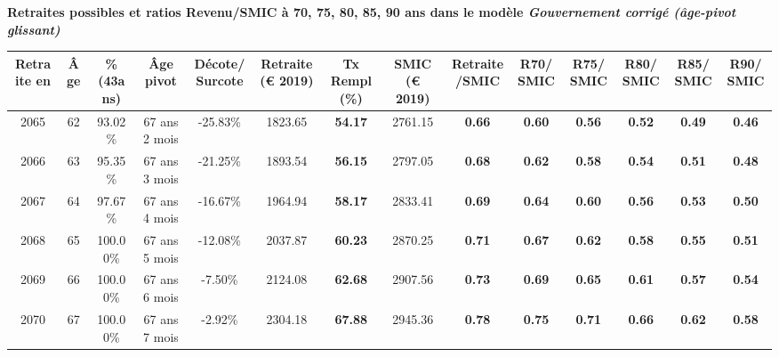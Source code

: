  \vspace{0.1cm} 
{\bf \noindent Retraites possibles et ratios Revenu/SMIC à 70, 75, 80, 85, 90 ans dans le modèle \emph{Gouvernement corrigé (âge-pivot glissant)}}  
 
\begin{adjustbox}{max width=\textwidth} 
\begin{tabular}[htb]{|c|c||c|c|c||c|c||c|c||c|c|c|c|c|} 
\hline 
 Retraite en &  Âge &  \%(43ans) &  Âge pivot &  Décote/Surcote &  Retraite (\euro{} 2019) &  Tx Rempl(\%) &  SMIC (\euro{} 2019) &  Retraite/SMIC &  R70/SMIC &  R75/SMIC &  R80/SMIC &  R85/SMIC &  R90/SMIC \\ 
\hline \hline 
 2065 &  62 &  93.02\% &  67 ans 2 mois &  -25.83\% &  1823.65 &  {\bf 54.17} &  2761.15 &  {\bf {\color{red} 0.66}} &  {\bf {\color{red} 0.60}} &  {\bf {\color{red} 0.56}} &  {\bf {\color{red} 0.52}} &  {\bf {\color{red} 0.49}} &  {\bf {\color{red} 0.46}} \\ 
\hline 
 2066 &  63 &  95.35\% &  67 ans 3 mois &  -21.25\% &  1893.54 &  {\bf 56.15} &  2797.05 &  {\bf {\color{red} 0.68}} &  {\bf {\color{red} 0.62}} &  {\bf {\color{red} 0.58}} &  {\bf {\color{red} 0.54}} &  {\bf {\color{red} 0.51}} &  {\bf {\color{red} 0.48}} \\ 
\hline 
 2067 &  64 &  97.67\% &  67 ans 4 mois &  -16.67\% &  1964.94 &  {\bf 58.17} &  2833.41 &  {\bf {\color{red} 0.69}} &  {\bf {\color{red} 0.64}} &  {\bf {\color{red} 0.60}} &  {\bf {\color{red} 0.56}} &  {\bf {\color{red} 0.53}} &  {\bf {\color{red} 0.50}} \\ 
\hline 
 2068 &  65 &  100.00\% &  67 ans 5 mois &  -12.08\% &  2037.87 &  {\bf 60.23} &  2870.25 &  {\bf {\color{red} 0.71}} &  {\bf {\color{red} 0.67}} &  {\bf {\color{red} 0.62}} &  {\bf {\color{red} 0.58}} &  {\bf {\color{red} 0.55}} &  {\bf {\color{red} 0.51}} \\ 
\hline 
 2069 &  66 &  100.00\% &  67 ans 6 mois &  -7.50\% &  2124.08 &  {\bf 62.68} &  2907.56 &  {\bf {\color{red} 0.73}} &  {\bf {\color{red} 0.69}} &  {\bf {\color{red} 0.65}} &  {\bf {\color{red} 0.61}} &  {\bf {\color{red} 0.57}} &  {\bf {\color{red} 0.54}} \\ 
\hline 
 2070 &  67 &  100.00\% &  67 ans 7 mois &  -2.92\% &  2304.18 &  {\bf 67.88} &  2945.36 &  {\bf {\color{red} 0.78}} &  {\bf {\color{red} 0.75}} &  {\bf {\color{red} 0.71}} &  {\bf {\color{red} 0.66}} &  {\bf {\color{red} 0.62}} &  {\bf {\color{red} 0.58}} \\ 
\hline 
\hline 
\end{tabular} 
\end{adjustbox} 
 
